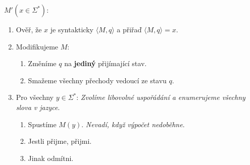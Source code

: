 \documentclass{article}
\begin{document}
$M'(x \in \Sigma^*)$:
\begin{enumerate}
  \item Ověř, že $x$ je syntakticky $\langle M,q \rangle$ a přiřaď
  $\langle M,q \rangle = x$.
  \item Modifikujeme $M$:
  \begin{enumerate}
    \item Změníme $q$ na \textbf{jediný} přijímající stav.
    \item Smažeme všechny přechody vedoucí ze stavu $q$.
  \end{enumerate}
  \item Pro všechny $y \in \Sigma^*$: \emph{Zvolíme libovolné uspořádání a
  enumerujeme všechny slova v jazyce}.
  \begin{enumerate}
    \item Spustíme $M(y)$. \emph{Nevadí, když výpočet nedoběhne}.
    \item Jestli přijme, přijmi.
    \item Jinak odmítni.
  \end{enumerate}
\end{enumerate}
\end{document}
